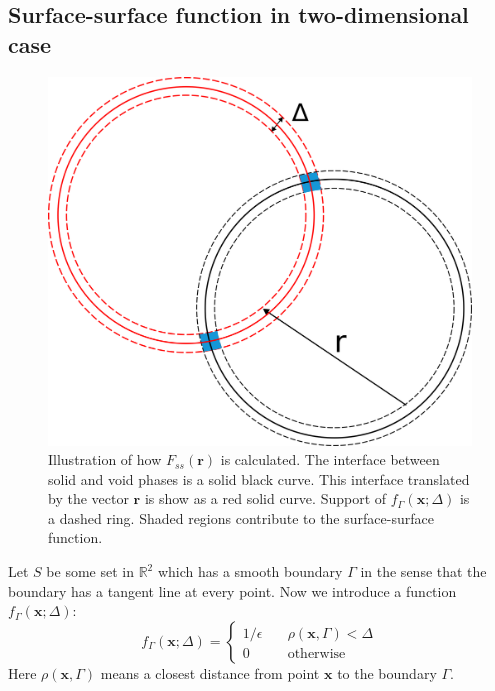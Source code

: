 \documentclass[reprint,amsmath,amssymb,aps,pre,showkeys,showpacs]{revtex4-1}
\begin{document}
\subsection{Surface-surface function in two-dimensional case}
\label{sec:fss-2d}
\begin{figure}
  \centering
  \includegraphics[width=\linewidth]{images/Fss.png}
  \caption[]{Illustration of how $F_{ss}(\bm{r})$ is calculated. The interface
    between solid and void phases is a solid black curve. This interface
    translated by the vector $\bm{r}$ is show as a red solid curve. Support of
    $f_\Gamma(\bm{x}; \Delta)$ is a dashed ring. Shaded regions contribute to
    the surface-surface function.}
  \label{fig:Fss-explained}
\end{figure}
Let $S$ be some set in $\mathbb{R}^2$ which has a smooth boundary $\Gamma$ in
the sense that the boundary has a tangent line at every point. Now we introduce
a function $f_\Gamma(\bm{x}; \Delta)$:
\begin{equation*}
  f_\Gamma(\bm{x}; \Delta) = \left\{
  \begin{array}{ll}
    1/\epsilon & \quad \rho(\bm{x}, \Gamma) < \Delta \\
    0 & \quad \text{otherwise}
  \end{array}
  \right.
\end{equation*}
Here $\rho(\bm{x}, \Gamma)$ means a closest distance from point $\bm{x}$ to the
boundary $\Gamma$.
\end{document}
